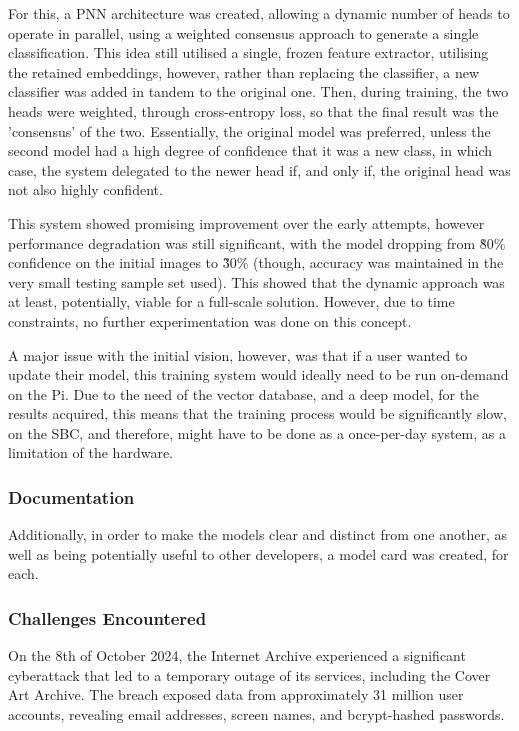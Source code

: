                 For this, a PNN architecture was created, allowing a dynamic number of heads to operate in parallel, using a weighted consensus approach to generate a single classification. This idea still utilised a single, frozen feature extractor, utilising the retained embeddings, however, rather than replacing the classifier, a new classifier was added in tandem to the original one. Then, during training, the two heads were weighted, through cross-entropy loss, so that the final result was the 'consensus' of the two. Essentially, the original model was preferred, unless the second model had a high degree of confidence that it was a new class, in which case, the system delegated to the newer head if, and only if, the original head was not also highly confident.
    
                This system showed promising improvement over the early attempts, however performance degradation was still significant, with the model dropping from \~80\% confidence on the initial images to \~30\% (though, accuracy was maintained in the very small testing sample set used). This showed that the dynamic approach was at least, potentially,  viable for a full-scale solution. However, due to time constraints, no further experimentation was done on this concept.
    
                A major issue with the initial vision, however, was that if a user wanted to update their model, this training system would ideally need to be run on-demand on the Pi. Due to the need of the vector database, and a deep model, for the results acquired, this means that the training process would be significantly slow, on the SBC, and therefore, might have to be done as a once-per-day system, as a limitation of the hardware.
    
            \subsubsection{Documentation}
    
                Additionally, in order to make the models clear and distinct from one another, as well as being potentially useful to other developers, a model card \cite{Mitchell_2019} was created, for each.
            
            \subsubsection{Challenges Encountered}
    
                On the 8th of October 2024, the Internet Archive experienced a significant cyberattack that led to a temporary outage of its services, including the Cover Art Archive. The breach exposed data from approximately 31 million user accounts, revealing email addresses, screen names, and bcrypt-hashed passwords. %
    
